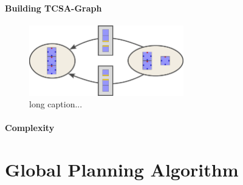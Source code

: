 
\paragraph{Building TCSA-Graph}

\begin{figure}
	\centering
	\includegraphics[width=0.6\textwidth]{figures/tcsa_multiedge.pdf}
	\caption[Two TCSA nodes with multiple edges.]{long caption...}
	\label{fig:tcsa_multiedge}
\end{figure}


\paragraph{Complexity}





\section{Global Planning Algorithm}
\label{sec:global_algo}



